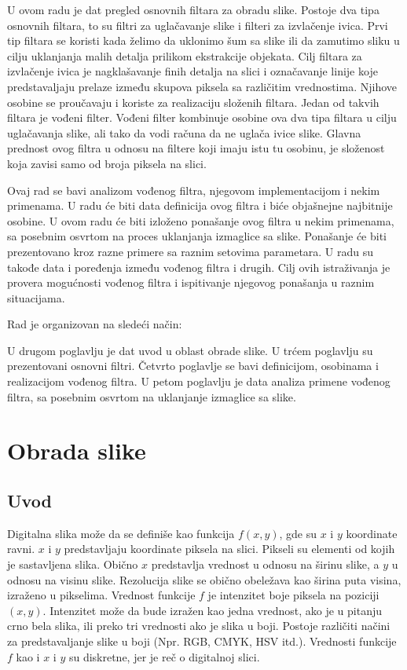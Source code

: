 \documentclass[a4paper,12pt,titlepage]{article}
\begin{document}
U ovom radu je dat pregled osnovnih filtara za obradu slike. Postoje dva tipa osnovnih filtara, to su filtri za uglačavanje slike i filteri za izvlačenje ivica. Prvi tip filtara se koristi kada želimo da uklonimo šum sa slike ili da zamutimo sliku u cilju uklanjanja malih detalja prilikom ekstrakcije objekata. Cilj filtara za izvlačenje ivica je nagklašavanje finih detalja na slici i označavanje linije koje predstavaljaju prelaze između skupova piksela sa različitim vrednostima. Njihove osobine se proučavaju i koriste za realizaciju složenih filtara. Jedan od takvih filtara je vođeni filter. Vođeni filter kombinuje osobine ova dva tipa filtara u cilju uglačavanja slike, ali tako da vodi računa da ne uglača ivice slike. Glavna prednost ovog filtra u odnosu na filtere koji imaju istu tu osobinu, je složenost koja zavisi samo od broja piksela na slici. 

Ovaj rad se bavi analizom vođenog filtra, njegovom implementacijom i nekim primenama. U radu će biti data definicija ovog filtra i biće objašnejne najbitnije osobine. U ovom radu će biti izloženo ponašanje ovog filtra u nekim primenama, sa posebnim osvrtom na proces uklanjanja izmaglice sa slike. Ponašanje će biti prezentovano kroz razne primere sa raznim setovima parametara. U radu su takođe data i poređenja između vođenog filtra i drugih. Cilj ovih istraživanja je provera mogućnosti vođenog filtra i ispitivanje njegovog ponašanja u raznim situacijama. 

Rad je organizovan na sledeći način:

U drugom poglavlju je dat uvod u oblast obrade slike. U trćem poglavlju su prezentovani osnovni filtri. Četvrto poglavlje se bavi definicijom, osobinama i realizacijom vođenog filtra. U petom poglavlju je data analiza primene vođenog filtra, sa posebnim osvrtom na uklanjanje izmaglice sa slike.

\section{Obrada slike}%

\subsection{Uvod}%

Digitalna slika može da se definiše kao funkcija $f(x, y)$, gde su $x$ i $y$ koordinate ravni. $x$ i $y$ predstavljaju koordinate piksela na slici. Pikseli su elementi od kojih je sastavljena slika. Obično $x$ predstavlja vrednost u odnosu na širinu slike, a $y$ u odnosu na visinu slike. Rezolucija slike se obično obeležava kao širina puta visina, izraženo u pikselima. Vrednost funkcije $f$ je intenzitet boje piksela na poziciji $(x, y)$. Intenzitet može da bude izražen kao jedna vrednost, ako je u pitanju crno bela slika, ili preko tri vrednosti ako je slika u boji. Postoje različiti načini za predstavaljanje slike u boji (Npr. RGB, CMYK, HSV itd.). Vrednosti funkcije $f$ kao i $x$ i $y$ su diskretne, jer je reč o digitalnoj slici. 
\end{document}
